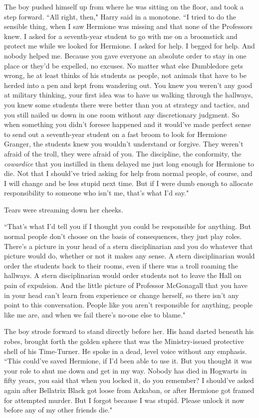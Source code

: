 The boy pushed himself up from where he was sitting on the floor, and took a step forward. ``All right, then," Harry said in a monotone. ``I tried to do the sensible thing, when I saw Hermione was missing and that none of the Professors knew. I asked for a seventh-year student to go with me on a broomstick and protect me while we looked for Hermione. I asked for help. I begged for help. And nobody helped me. Because you gave everyone an absolute order to stay in one place or they'd be expelled, no excuses. No matter what else Dumbledore gets wrong, he at least thinks of his students as people, not animals that have to be herded into a pen and kept from wandering out. You knew you weren't any good at military thinking, your first idea was to have us walking through the hallways, you knew some students there were better than you at strategy and tactics, and you still nailed us down in one room without any discretionary judgment. So when something you didn't foresee happened and it would've made perfect sense to send out a seventh-year student on a fast broom to look for Hermione Granger, the students knew you wouldn't understand or forgive. They weren't afraid of the troll, they were afraid of you. The discipline, the conformity, the \emph{cowardice} that you instilled in them delayed me just long enough for Hermione to die. Not that I should've tried asking for help from normal people, of course, and I will change and be less stupid next time. But if I were dumb enough to allocate responsibility to someone who isn't me, that's what I'd say."

Tears were streaming down her cheeks.

``That's what I'd tell you if I thought you could be responsible for anything. But normal people don't choose on the basis of consequences, they just play roles. There's a picture in your head of a stern disciplinarian and you do whatever that picture would do, whether or not it makes any sense. A stern disciplinarian would order the students back to their rooms, even if there was a troll roaming the hallways. A stern disciplinarian would order students not to leave the Hall on pain of expulsion. And the little picture of Professor McGonagall that you have in your head can't learn from experience or change herself, so there isn't any point to this conversation. People like you aren't responsible for anything, people like me are, and when we fail there's no-one else to blame."

The boy strode forward to stand directly before her. His hand darted beneath his robes, brought forth the golden sphere that was the Ministry-issued protective shell of his Time-Turner. He spoke in a dead, level voice without any emphasis. ``This could've saved Hermione, if I'd been able to use it. But you thought it was your role to shut me down and get in my way. Nobody has died in Hogwarts in fifty years, you said that when you locked it, do you remember? I should've asked again after Bellatrix Black got loose from Azkaban, or after Hermione got framed for attempted murder. But I forgot because I was stupid. Please unlock it now before any of my other friends die."

